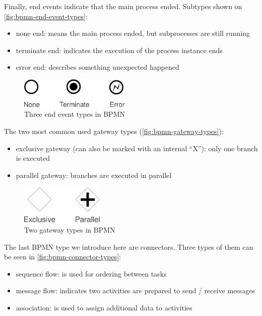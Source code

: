 Finally, end events indicate that the main process ended. Subtypes shown on
\autoref{fig:bpmn-end-event-types}:

\begin{itemize}
\item none end: means the main process ended, but subprocesses are still running
\item terminate end: indicates the execution of the process instance ends
\item error end: describes something unexpected happened
\end{itemize}

\begin{figure}[H]
\centering
\includegraphics[width=200px,keepaspectratio]{bpmn-end-event-types.pdf}
\caption{Three end event types in BPMN}
\label{fig:bpmn-end-event-types}
\end{figure}

The two most common used gateway types (\autoref{fig:bpmn-gateway-types}):

\begin{itemize}
\item exclusive gateway (can also be marked with an internal ``X''): only one branch is executed
\item parallel gateway: branches are executed in parallel
\end{itemize}

\begin{figure}[H]
\centering
\includegraphics[width=150px,keepaspectratio]{bpmn-gateway-types.pdf}
\caption{Two gateway types in BPMN}
\label{fig:bpmn-gateway-types}
\end{figure}

The last BPMN type we introduce here are connectors. Three types of them can be
seen in \autoref{fig:bpmn-connector-types}:

\begin{itemize}
\item sequence flow: is used for ordering between tasks
\item message flow: indicates two activities are prepared to send / receive messages
\item association: is used to assign additional data to activities
\end{itemize}


